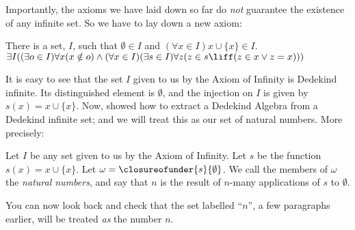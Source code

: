 \documentclass[../../../include/open-logic-section]{subfiles}
\begin{document}
Importantly, the axioms we have laid down so far do \emph{not} guarantee the existence of any infinite set. So we have to lay down a new axiom:
\begin{axiom*}[Infinity] There is a set, $I$, such that $\emptyset \in I$ and $(\forall x \in I) x \cup \{x\} \in I$.\\
	$\exists I((\exists o \in I)\forall x(x \notin o) \land (\forall x \in I)(\exists s \in I)\forall z(z \in s \liff (z \in x \lor z = x)))$
\end{axiom*}\noindent
It is easy to see that the set $I$ given to us by the Axiom of Infinity is Dedekind infinite. Its distinguished element is $\emptyset$, and the injection on $I$ is given by $s(x) = x\cup \{x\}$. Now,  showed how to extract a Dedekind Algebra from a Dedekind infinite set; and we will treat this as our set of natural numbers. More precisely:
\begin{defn}
	Let $I$ be any set given to us by the Axiom of Infinity. Let $s$ be the function $s(x) = x \cup \{x\}$. Let $\omega = \closureofunder{s}{\emptyset}$. We call the members of $\omega$ the \emph{natural numbers}, and say that $n$ is the result of $n$-many applications of $s$ to $\emptyset$. 
\end{defn}\noindent
You can now look back and check that the set labelled ``$n$'', a few paragraphs earlier, will be treated \emph{as} the number $n$. 
\end{document}

